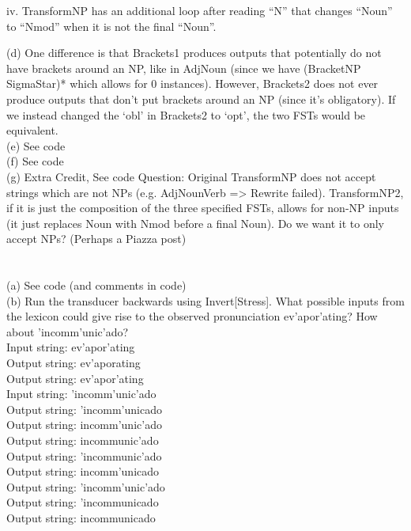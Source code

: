 \documentclass[11pt]{article} %
\begin{document}
iv. TransformNP has an additional loop after reading ``N” that changes ``Noun” to ``Nmod” when it is not the final ``Noun”.\\

\newpage

(d) One difference is that Brackets1 produces outputs that potentially do not have brackets around an NP, like in AdjNoun (since we have (BracketNP SigmaStar)* which allows for 0 instances). However, Brackets2 does not ever produce outputs that don’t put brackets around an NP (since it’s obligatory). If we instead changed the ‘obl’ in Brackets2 to ‘opt’, the two FSTs would be equivalent.\\

(e) See code\\

(f) See code\\

(g) Extra Credit, See code
Question: Original TransformNP does not accept strings which are not NPs (e.g. AdjNounVerb => Rewrite failed). TransformNP2, if it is just the composition of the three specified FSTs, allows for non-NP inputs (it just replaces Noun with Nmod before a final Noun). Do we want it to only accept NPs? (Perhaps a Piazza post)\\

\newpage

\section{}

(a) See code (and comments in code)\\


(b) Run the transducer backwards using Invert[Stress]. What possible inputs from the lexicon could give rise to the observed pronunciation ev’apor’ating? How about ’incomm’unic’ado? \\

Input string: ev'apor'ating\\
Output string: ev'aporating\\
Output string: ev'apor'ating\\

Input string: 'incomm'unic'ado\\
Output string: 'incomm'unicado\\
Output string: incomm'unic'ado\\
Output string: incommunic'ado\\
Output string: 'incommunic'ado\\
Output string: incomm'unicado\\
Output string: 'incomm'unic'ado\\
Output string: 'incommunicado\\
Output string: incommunicado\\
\end{document}
